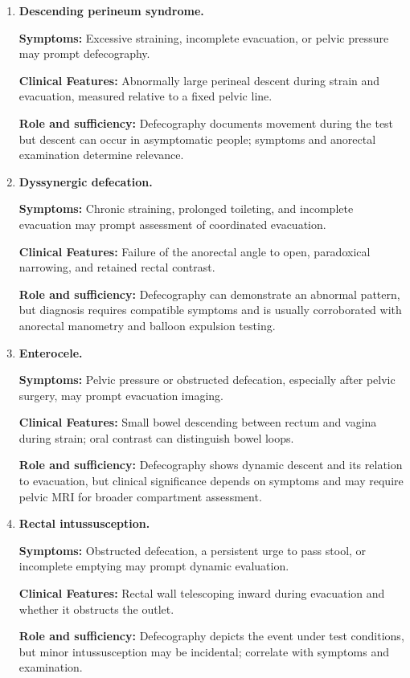 \begin{enumerate}[leftmargin=*,itemsep=0.45em,topsep=0.4em]
\item \textbf{Descending perineum syndrome.}\par\noindent\textbf{Symptoms:} Excessive straining, incomplete evacuation, or pelvic pressure may prompt defecography.\par\noindent\textbf{Clinical Features:} Abnormally large perineal descent during strain and evacuation, measured relative to a fixed pelvic line.\par\noindent\textbf{Role and sufficiency:} Defecography documents movement during the test but descent can occur in asymptomatic people; symptoms and anorectal examination determine relevance.
\item \textbf{Dyssynergic defecation.}\par\noindent\textbf{Symptoms:} Chronic straining, prolonged toileting, and incomplete evacuation may prompt assessment of coordinated evacuation.\par\noindent\textbf{Clinical Features:} Failure of the anorectal angle to open, paradoxical narrowing, and retained rectal contrast.\par\noindent\textbf{Role and sufficiency:} Defecography can demonstrate an abnormal pattern, but diagnosis requires compatible symptoms and is usually corroborated with anorectal manometry and balloon expulsion testing.
\item \textbf{Enterocele.}\par\noindent\textbf{Symptoms:} Pelvic pressure or obstructed defecation, especially after pelvic surgery, may prompt evacuation imaging.\par\noindent\textbf{Clinical Features:} Small bowel descending between rectum and vagina during strain; oral contrast can distinguish bowel loops.\par\noindent\textbf{Role and sufficiency:} Defecography shows dynamic descent and its relation to evacuation, but clinical significance depends on symptoms and may require pelvic MRI for broader compartment assessment.
\item \textbf{Rectal intussusception.}\par\noindent\textbf{Symptoms:} Obstructed defecation, a persistent urge to pass stool, or incomplete emptying may prompt dynamic evaluation.\par\noindent\textbf{Clinical Features:} Rectal wall telescoping inward during evacuation and whether it obstructs the outlet.\par\noindent\textbf{Role and sufficiency:} Defecography depicts the event under test conditions, but minor intussusception may be incidental; correlate with symptoms and examination.

\end{enumerate}
